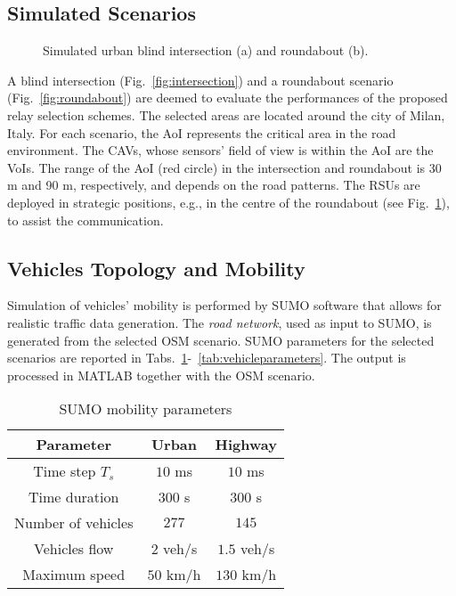 \documentclass[journal]{IEEEtran}
\begin{document}
\subsection{Simulated Scenarios} \label{sec:sim_scen}
\begin{figure}[!t] 
\centering
{}
\caption{Simulated urban blind intersection (a) and roundabout (b).}
\label{fig:scenarios}
\end{figure}

A blind intersection (Fig.~\ref{fig:intersection}) and a roundabout scenario (Fig.~\ref{fig:roundabout}) are deemed to evaluate the performances of the proposed relay selection schemes. The selected areas are located around the city of Milan, Italy.
For each scenario, the AoI represents the critical area in the road environment. The CAVs, whose sensors' field of view is within the AoI are the VoIs. The range of the AoI (red circle) in the intersection and roundabout is 30 m and 90 m, respectively, and depends on the road patterns.%
The RSUs are deployed in strategic positions, e.g., in the centre of the roundabout (see Fig.~\ref{fig:scenarios}), to assist the communication.

\subsection{Vehicles Topology and Mobility}

Simulation of vehicles' mobility is performed by SUMO software that allows for realistic traffic data generation. 
The \textit{road network}, used as input to SUMO, is generated from the selected OSM scenario. 
SUMO parameters for the selected scenarios are reported in Tabs.~\ref{tab:SUMOparameter}-~\ref{tab:vehicleparameters}. The output is processed in MATLAB together with the OSM scenario.

\begin{table}[t] 
\centering
\caption{SUMO mobility parameters}
\begin{tabular}{ | c | c | c |}
	\hline
	\textbf{Parameter}  & \textbf{Urban} & \textbf{Highway}\\ \hline\hline
	Time step $T_s$ & $10$ ms & $10$ ms\\ 
	Time duration & $300$ s & $300$ s  \\ 
	Number of vehicles & $277$ & $145$ \\ 
	Vehicles flow & $2$ veh/s & $1.5$ veh/s \\ 
	Maximum speed & $50$ km/h & $130$ km/h \\ \hline\hline
	\end{tabular}
\label{tab:SUMOparameter}
\end{table}
\end{document}
